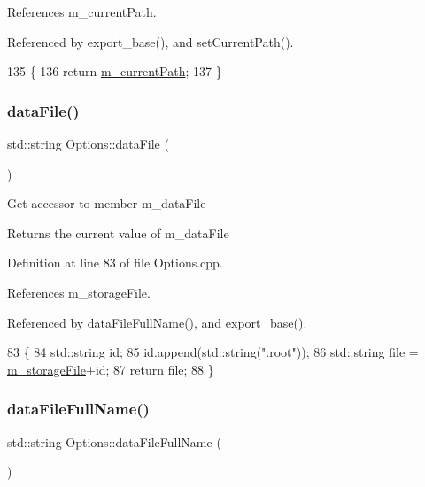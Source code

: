References m\+\_\+current\+Path.



Referenced by export\+\_\+base(), and set\+Current\+Path().


\begin{DoxyCode}
135                                  \{
136                 \textcolor{keywordflow}{return} \hyperlink{classOptions_a9d82ad17fc1fd2315fc8a9e8d0d34f33}{m\_currentPath};
137         \}
\end{DoxyCode}
\mbox{\label{classOptions_a166984c16a957bf2e8e0f0a1ce39eb73}} 
\subsubsection{\texorpdfstring{data\+File()}{dataFile()}}
{\footnotesize\ttfamily std\+::string Options\+::data\+File (\begin{DoxyParamCaption}{ }\end{DoxyParamCaption})}

Get accessor to member m\+\_\+data\+File \begin{DoxyReturn}{Returns}
the current value of m\+\_\+data\+File 
\end{DoxyReturn}


Definition at line 83 of file Options.\+cpp.



References m\+\_\+storage\+File.



Referenced by data\+File\+Full\+Name(), and export\+\_\+base().


\begin{DoxyCode}
83                              \{
84   std::string id;
85   \textcolor{keywordtype}{id}.append(std::string(\textcolor{stringliteral}{".root"}));
86   std::string file = \hyperlink{classOptions_a4d952db4e93d3aae6db86d89faa3677a}{m\_storageFile}+id;
87   \textcolor{keywordflow}{return} file;
88 \}
\end{DoxyCode}
\mbox{\label{classOptions_ab1cd9f237e9c18fd72323c74565453f8}} 
\subsubsection{\texorpdfstring{data\+File\+Full\+Name()}{dataFileFullName()}}
{\footnotesize\ttfamily std\+::string Options\+::data\+File\+Full\+Name (\begin{DoxyParamCaption}{ }\end{DoxyParamCaption})\hspace{0.3cm}{\ttfamily [inline]}}

